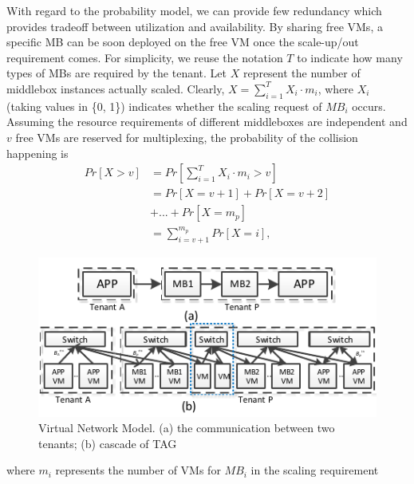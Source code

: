 \documentclass[review]{elsarticle}
\begin{document}
With regard to the probability model, 
we can provide few redundancy which provides tradeoff between utilization and availability. By sharing free VMs,
a specific MB can be soon deployed on the free VM once the scale-up/out requirement comes. %
For simplicity, we reuse the notation $T$ to indicate how many types of MBs are required by the tenant. Let $X$ represent the number of middlebox instances actually scaled. %
Clearly, $X=\sum_{i=1}^{T}X_{i}\cdot m_{i}$, where $X_{i}$ 
(taking values in \{0, 1\}) 
indicates whether the scaling request of $MB_i$ occurs.
Assuming the resource requirements of different middleboxes are independent and $v$ free VMs are reserved for multiplexing, the probability of the collision happening is
\begin{equation} 
\begin{aligned}
Pr\left[X>v\right]
& = Pr\left[\sum_{i=1}^{T}X_{i}\cdot m_{i}>v\right]\\
& = Pr\left[X=v+1 \right] + Pr\left[X=v+2 \right]\\
& + ...+ Pr\left[X=m_{p} \right] \\
& = \sum_{i=v+1}^{m_{p}}Pr\left[X=i \right],
\end{aligned}
\end{equation}
\begin{figure}
	\centering
	\includegraphics[width=4.5in]{fig/scalability.pdf}
	\caption{Virtual Network Model. (a) the communication between two tenants; (b) cascade of TAG}
	\label{fig:scalability}
\end{figure}where $m_i$ represents the number of VMs for $MB_{i}$ in the scaling requirement 
\end{document}
